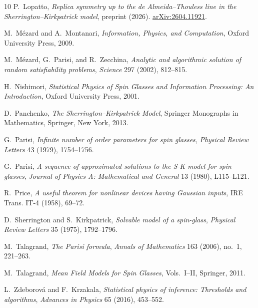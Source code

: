 \documentclass[11pt]{article}
\numberwithin{equation}{section}
\newcommand{\1}{\mathbf 1}
\begin{document}
\begin{thebibliography}{10}
P.~Lopatto,
\newblock
\emph{Replica symmetry up to the de Almeida--Thouless line in the
Sherrington--Kirkpatrick model},
\newblock preprint (2026).
\href{https://arxiv.org/abs/2604.11921}{arXiv:2604.11921}.

M.~M{\'e}zard and A.~Montanari,
\newblock
\emph{Information, Physics, and Computation},
\newblock Oxford University Press, 2009.

M.~M{\'e}zard, G.~Parisi, and R.~Zecchina,
\newblock
\emph{Analytic and algorithmic solution of random satisfiability problems},
\newblock \emph{Science} 297 (2002), 812--815.

H.~Nishimori,
\newblock
\emph{Statistical Physics of Spin Glasses and Information Processing:
An Introduction},
\newblock Oxford University Press, 2001.

D.~Panchenko,
\newblock
\emph{The Sherrington--Kirkpatrick Model},
\newblock Springer Monographs in Mathematics, Springer, New York, 2013.

G.~Parisi,
\newblock
\emph{Infinite number of order parameters for spin glasses},
\newblock \emph{Physical Review Letters} 43 (1979), 1754--1756.

G.~Parisi,
\newblock
\emph{A sequence of approximated solutions to the S-K model for spin glasses},
\newblock \emph{Journal of Physics A: Mathematical and General} 13 (1980),
L115--L121.

R.~Price,
\newblock
\emph{A useful theorem for nonlinear devices having Gaussian inputs},
\newblock IRE Trans. IT-4 (1958), 69--72.

D.~Sherrington and S.~Kirkpatrick,
\newblock
\emph{Solvable model of a spin-glass},
\newblock \emph{Physical Review Letters} 35 (1975), 1792--1796.

M.~Talagrand,
\newblock
\emph{The Parisi formula},
\newblock \emph{Annals of Mathematics} 163 (2006), no.~1, 221--263.

M.~Talagrand,
\newblock
\emph{Mean Field Models for Spin Glasses}, Vols.~I--II,
\newblock Springer, 2011.

L.~Zdeborov{\'a} and F.~Krzakala,
\newblock
\emph{Statistical physics of inference: Thresholds and algorithms},
\newblock \emph{Advances in Physics} 65 (2016), 453--552.

\end{thebibliography}
\end{document}
